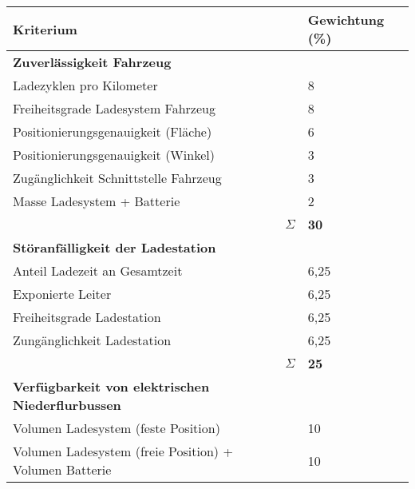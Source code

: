 \begin{table}
	\centering
	\begin{tabularx}{\linewidth}{Xrl}
		\toprule
		Kriterium                                                &                   & Gewichtung (\%) \\ \midrule
		\textbf{Zuverlässigkeit Fahrzeug}                        &                   &  \\
		Ladezyklen pro Kilometer                                 &                   & 8               \\
		Freiheitsgrade Ladesystem Fahrzeug                       &                   & 8               \\
		Positionierungsgenauigkeit (Fläche)                      &                   & 6               \\
		Positionierungsgenauigkeit (Winkel)                      &                   & 3               \\
		Zugänglichkeit Schnittstelle Fahrzeug                    &                   & 3               \\
		Masse Ladesystem + Batterie                              &                   & 2               \\ \midrule
		                                                         &          $\Sigma$ & \textbf{30}     \\
		\textbf{Störanfälligkeit der Ladestation}                &                   &  \\
		Anteil Ladezeit an Gesamtzeit                            &                   & 6,25             \\
		Exponierte Leiter                                        &                   & 6,25             \\
		Freiheitsgrade Ladestation                               &                   & 6,25             \\
		Zungänglichkeit Ladestation                              &                   & 6,25 \\ \midrule
		                                                         &          $\Sigma$ & \textbf{25}     \\
		\textbf{Verfügbarkeit von elektrischen Niederflurbussen} &                   &  \\
		Volumen Ladesystem (feste Position)                      &                   & 10              \\
		Volumen Ladesystem (freie Position) + Volumen Batterie   &                   & 10              \\ \midrule

\end{tabularx}
\end{table}
